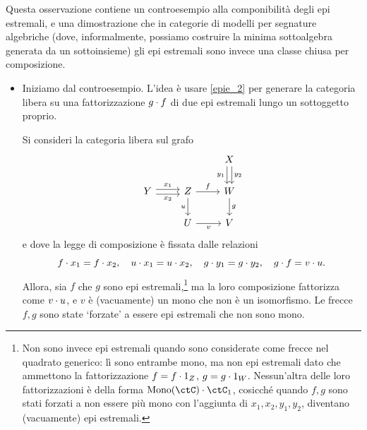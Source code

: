 \begin{remark}\label{compo_estremali}
 Questa osservazione contiene un controesempio alla componibilità degli epi estremali, e una dimostrazione che in categorie di modelli per segnature algebriche (dove, informalmente, possiamo costruire la minima sottoalgebra generata da un sottoinsieme) gli epi estremali sono invece una classe chiusa per composizione.
 \begin{itemize}
  \item Iniziamo dal controesempio. L'idea è usare \ref{epie_2} per generare la categoria libera su una fattorizzazione \(g\cdot f\) di due epi estremali lungo un sottoggetto proprio.

        Si consideri la categoria libera sul grafo
        \[\begin{tikzcd}
          && X \\
          Y & Z & W \\
          & U & V
          \arrow["{y_2}", shift left=1, from=1-3, to=2-3]
          \arrow["{y_1}"', shift right=1, from=1-3, to=2-3]
          \arrow["{x_2}"', shift right=1, from=2-1, to=2-2]
          \arrow["{x_1}", shift left=1, from=2-1, to=2-2]
          \arrow["f", from=2-2, to=2-3]
          \arrow["u"', from=2-2, to=3-2]
          \arrow["g", from=2-3, to=3-3]
          \arrow["v"', from=3-2, to=3-3]
         \end{tikzcd}\]
        e dove la legge di composizione è fissata dalle relazioni
        \[f \cdot x_1 = f \cdot x_2, \quad u \cdot x_1 = u \cdot x_2, \quad g \cdot y_1 = g \cdot y_2, \quad g \cdot f = v \cdot u.\]
        Allora, sia \(f\) che \(g\) sono epi estremali,\footnote{Non sono invece epi estremali quando sono considerate come frecce nel quadrato generico: lì sono entrambe mono, ma non epi estremali dato che ammettono la fattorizzazione \(f = f\cdot 1_Z\), \(g = g\cdot 1_W\). Nessun'altra delle loro fattorizzazioni è della forma \(\Mono[\ctC]\cmp \ctC_1\), cosicché quando \(f,g\) sono stati forzati a non essere più mono con l'aggiunta di \(x_1,x_2,y_1,y_2\), diventano (vacuamente) epi estremali.} ma la loro composizione fattorizza come \(v\cdot u\), e \(v\) è (vacuamente) un mono che non è un isomorfismo. Le frecce \(f,g\) sono state `forzate' a essere epi estremali che non sono mono.

\end{itemize}
\end{remark}
